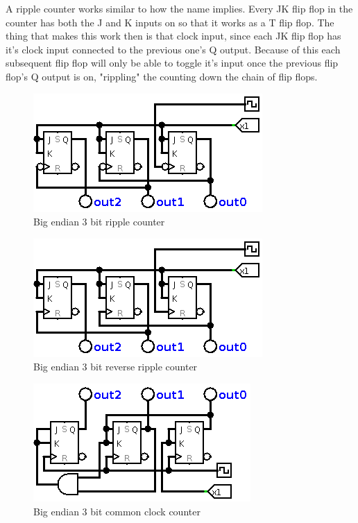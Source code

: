 \documentclass[11pt]{scrartcl}
\begin{document}
A ripple counter works similar to how the name implies. Every JK flip flop
in the counter has both the J and K inputs on so that it works as a T flip flop.
The thing that makes this work then is that clock input, since each JK flip flop
has it's clock input connected to the previous one's Q output. Because of this
each subsequent flip flop will only be able to toggle it's input once the previous
flip flop's Q output is on, "rippling" the counting down the chain of flip flops.

\begin{figure}[h]
    \centering
    \includegraphics[scale=0.5]{images/bigendian3bitripplecounter.png}
    \caption{Big endian 3 bit ripple counter}
\end{figure}

\begin{figure}[h]
    \centering
    \includegraphics[scale=0.5]{images/bigendian3bitreverseripplecounter.png}
    \caption{Big endian 3 bit reverse ripple counter}
\end{figure}

\begin{figure}[h]
    \centering
    \includegraphics[scale=0.5]{images/bigendian3bitcommonclockcounter.png}
    \caption{Big endian 3 bit common clock counter}
\end{figure}
\end{document}
